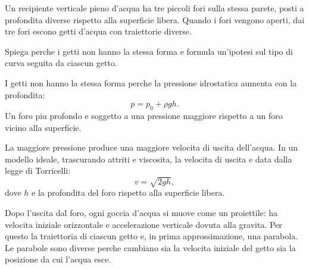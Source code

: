 
\begin{esercizio}
Un recipiente verticale pieno d'acqua ha tre piccoli fori sulla stessa parete,
posti a profondita diverse rispetto alla superficie libera. Quando i fori
vengono aperti, dai tre fori escono getti d'acqua con traiettorie diverse.

Spiega perche i getti non hanno la stessa forma e formula un'ipotesi sul tipo
di curva seguita da ciascun getto.
\end{esercizio}

\begin{soluzione}
I getti non hanno la stessa forma perche la pressione idrostatica aumenta con
la profondita:
\[
p=p_0+\rho gh.
\]
Un foro piu profondo e soggetto a una pressione maggiore rispetto a un foro
vicino alla superficie.

La maggiore pressione produce una maggiore velocita di uscita dell'acqua. In un
modello ideale, trascurando attriti e viscosita, la velocita di uscita e data
dalla legge di Torricelli:
\[
v=\sqrt{2gh},
\]
dove \(h\) e la profondita del foro rispetto alla superficie libera.

Dopo l'uscita dal foro, ogni goccia d'acqua si muove come un proiettile: ha
velocita iniziale orizzontale e accelerazione verticale dovuta alla gravita.
Per questo la traiettoria di ciascun getto e, in prima approssimazione, una
parabola. Le parabole sono diverse perche cambiano sia la velocita iniziale del
getto sia la posizione da cui l'acqua esce.
\end{soluzione}
